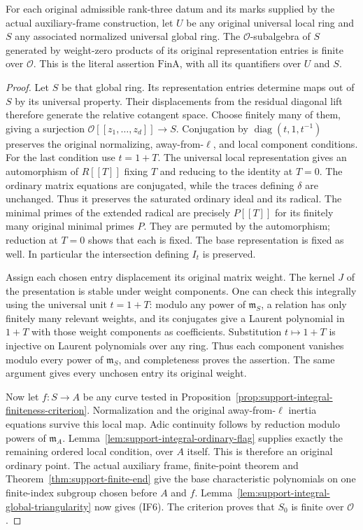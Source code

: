 \begin{theorem}
\label{thm:support-actual-integral-finiteness}
For each original admissible rank-three datum and its marks supplied
by the actual auxiliary-frame construction, let $U$ be any original
universal local ring and $S$ any associated normalized universal global
ring.  The $\mathcal O$-subalgebra of $S$ generated by weight-zero
products of its original representation entries is finite over
$\mathcal O$.  This is the literal assertion $\mathrm{FinA}$, with
all its quantifiers over $U$ and $S$\cite{integral-finiteness-source}.
\end{theorem}

\begin{proof}
Let $S$ be that global ring.  Its representation entries determine
maps out of $S$ by its universal property.  Their displacements from
the residual diagonal lift therefore generate the relative
cotangent space.  Choose finitely many of them, giving a surjection
$\mathcal O[[z_1,\ldots,z_d]]\to S$.  Conjugation by
$\operatorname{diag}(t,1,t^{-1})$ preserves the original normalizing,
away-from-$\ell$, and local component conditions.  For the last
condition use $t=1+T$.  The universal local representation gives an
automorphism of $R[[T]]$ fixing $T$ and reducing to the identity at
$T=0$.  The ordinary matrix equations are conjugated, while the traces
defining $\delta$ are unchanged.  Thus it preserves the saturated
ordinary ideal and its radical.  The minimal primes of the extended
radical are precisely $P[[T]]$ for its finitely many original minimal
primes $P$.  They are permuted by the automorphism; reduction at
$T=0$ shows that each is fixed.  The base representation is fixed as
well.  In particular the intersection defining $I_t$ is preserved.

Assign each chosen entry displacement its original matrix weight.
The kernel $J$ of the presentation is stable under weight components.
One can check this integrally using the universal unit $t=1+T$:
modulo any power of $\mathfrak m_S$, a relation has only finitely
many relevant weights, and its conjugates give a Laurent polynomial
in $1+T$ with those weight components as coefficients.  Substitution
$t\mapsto1+T$ is injective on Laurent polynomials over any ring.
Thus each component vanishes modulo every power of $\mathfrak m_S$,
and completeness proves the assertion.  The same argument gives
every unchosen entry its original weight.

Now let $f:S\to A$ be any curve tested in
Proposition~\ref{prop:support-integral-finiteness-criterion}.
Normalization and the original away-from-$\ell$ inertia equations
survive this local map.  Adic continuity follows by reduction modulo
powers of $\mathfrak m_A$.  Lemma~\ref{lem:support-integral-ordinary-flag}
supplies exactly the remaining ordered local condition, over $A$
itself.  This is therefore an original ordinary point.  The actual
auxiliary frame, finite-point theorem and
Theorem~\ref{thm:support-finite-end} give the base characteristic
polynomials on one finite-index subgroup chosen before $A$ and $f$.
Lemma~\ref{lem:support-integral-global-triangularity} now gives
(IF6).  The criterion proves that $S_0$ is finite over $\mathcal O$.


\end{proof}
